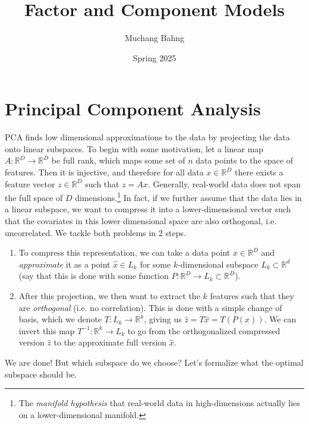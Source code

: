 \documentclass{article}
\begin{document}
\title{Factor and Component Models}
\author{Muchang Bahng}
\date{Spring 2025}

\maketitle
\tableofcontents
\pagebreak

\section{Principal Component Analysis} 
  
  PCA finds low dimensional approximations to the data by projecting the data onto linear subspaces. To begin with some motivation, let a linear map $A: \mathbb{R}^D \rightarrow \mathbb{R}^D$ be full rank, which maps some set of $n$ data points to the space of features. Then it is injective, and therefore for all data $x \in \mathbb{R}^D$ there exists a feature vector $z \in \mathbb{R}^D$ such that $z = Ax$. Generally, real-world data does not span the full space of $D$ dimensions.\footnote{The \textit{manifold hypothesis} that real-world data in high-dimensions actually lies on a lower-dimensional manifold. } In fact, if we further assume that the data lies in a linear subspace, we want to compress it into a lower-dimensional vector such that the covariates in this lower dimensional space are also orthogonal, i.e. uncorrelated. We tackle both problems in 2 steps. 
  \begin{enumerate}
    \item To compress this representation, we can take a data point $x \in \mathbb{R}^D$ and \textit{approximate} it as a point $\hat{x} \in L_k$ for some $k$-dimensional subspace $L_k \subset \mathbb{R}^d$ (say that this is done with some function $P: \mathbb{R}^D \rightarrow L_k \subset \mathbb{R}^D$). 
    \item After this projection, we then want to extract the $k$ features such that they are \textit{orthogonal} (i.e. no correlation). This is done with a simple change of basis, which we denote $T: L_k \rightarrow \mathbb{R}^k$, giving us $\hat{z} = T \hat{x} = T (P(x))$. We can invert this map $T^{-1} : \mathbb{R}^k \rightarrow L_k$ to go from the orthogonalized compressed version $\hat{z}$ to the approximate full version $\hat{x}$.
  \end{enumerate}
  We are done! But which subspace do we choose? Let's formalize what the optimal subspace should be. 
\end{document}

